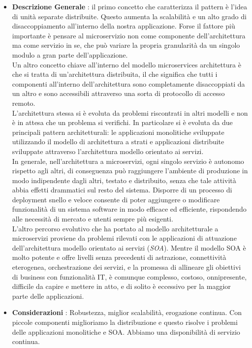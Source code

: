 {{{				\begin{itemize}\itemsep1pt
					\item \textbf{Descrizione Generale} : il primo concetto che caratterizza il pattern è l'idea di unità separate distribuite. Questo aumenta la scalabilità e un alto grado di disaccoppiamento all'interno della nostra applicazione. Forse il fattore più importante è pensare al microservizio non come componente dell'architettura ma come servizio in se, che può variare la propria granularità da un singolo modulo a gran parte dell'applicazione.\\
					Un altro concetto chiave all'interno del modello microservices architettura è che si tratta di un'architettura distribuita, il che significa che tutti i componenti all'interno dell'architettura sono completamente disaccoppiati da un altro e sono accessibili attraverso una sorta di protocollo di accesso remoto.\\
					L'architettura stessa si è evoluta da problemi riscontrati in altri modelli e non è in attesa che un problema si verifichi. In particolare si è evoluta da due principali pattern architetturali: le applicazioni monolitiche sviluppate utilizzando il modello di architettura a strati e applicazioni distribuite sviluppate attraverso l'architettura modello orientato ai servizi.\\
					In generale, nell'architettura a microservizi, ogni singolo servizio è autonomo rispetto agli altri, di conseguenza può raggiungere l’ambiente di produzione in modo indipendente dagli altri, testato e distribuito, senza che tale attività abbia effetti drammatici sul resto del sistema. Disporre di un processo di deployment snello e veloce consente di poter aggiungere o modificare funzionalità di un sistema software in modo efficace ed efficiente, rispondendo alle necessità di mercato e utenti sempre più esigenti.\\
					L'altro percorso evolutivo che ha portato al modello architetturale a microservizi proviene da problemi rilevati con le applicazioni di attuazione dell'architettura modello orientato ai servizi (\textit{SOA}). Mentre il modello SOA è molto potente e offre livelli senza precedenti di astrazione, connettività eterogenea, orchestrazione dei servizi, e la promessa di allineare gli obiettivi di business con funzionalità IT, è comunque complesso, costoso, onnipresente, difficile da capire e mettere in atto, e di solito è eccessivo per la maggior parte delle applicazioni.\\
					\item \textbf{Considerazioni} : Robustezza, miglior scalabilità, erogazione continua. Con piccole componenti miglioriamo la distribuzione e questo risolve i problemi delle applicazioni monolitiche e SOA. Abbiamo una disponibilità di servizio continua.\\

\end{itemize}}}}
